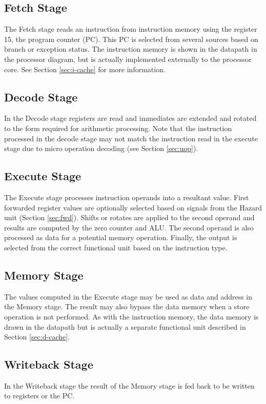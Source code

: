 \subsection{Fetch Stage}
The Fetch stage reads an instruction from instruction memory using the register 15, the program counter (PC).
This PC is selected from several sources based on branch or exception status.
The instruction memory is shown in the datapath in the processor diagram, but is actually implemented externally to the processor core. 
See Section \ref{sec:i-cache} for more information.

\subsection{Decode Stage}
In the Decode stage registers are read and immediates are extended and rotated to the form required for arithmetic processing. 
Note that the instruction processed in the decode stage may not match the instruction read in the execute stage due to micro operation decoding (see Section \ref{sec:uop}).

\subsection{Execute Stage}
The Execute stage processes instruction operands into a resultant value. 
First forwarded register values are optionally selected based on signals from the Hazard unit (Section \ref{sec:fwd}).
Shifts or rotates are applied to the second operand and results are computed by the zero counter and ALU. 
The second operand is also processed as data for a potential memory operation. 
Finally, the output is selected from the correct functional unit based on the instruction type.

\subsection{Memory Stage}
The values computed in the Execute stage may be used as data and address in the Memory stage.
The result may also bypass the data memory when a store operation is not performed.
As with the instruction memory, the data memory is drawn in the datapath but is actually a separate functional unit described in Section \ref{sec:d-cache}.

\subsection{Writeback Stage}
In the Writeback stage the result of the Memory stage is fed back to be written to registers or the PC.
